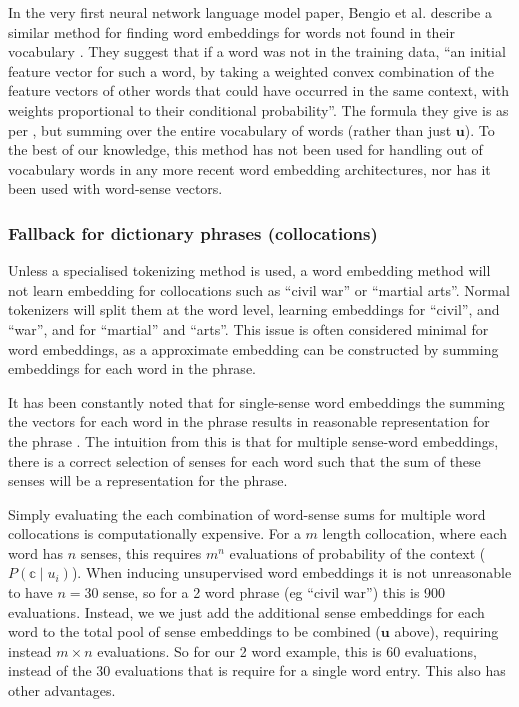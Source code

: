 \documentclass{sig-alternate}
\renewcommand{\u}{\mathbf{u}}
\begin{document}
In the very first neural network language model paper, Bengio et al. describe a similar method for finding word embeddings for words not found in their vocabulary \parencite{NPLM}. They suggest that if a word was not in the training data, \enquote{an initial feature vector for such a word, by taking a weighted convex combination of the feature vectors of other words that could have occurred in the same context, with weights proportional to their conditional probability}. The formula they give is as per , but summing over the entire vocabulary of words (rather than just $\u$). To the best of our knowledge, this method has not been used for handling out of vocabulary words in any more recent word embedding architectures, nor has it been used with word-sense vectors.


\subsubsection {Fallback for dictionary phrases (collocations)}
Unless a specialised tokenizing method is used, a word embedding method will not learn embedding for collocations such as ``civil war'' or ``martial arts''. Normal tokenizers will split them at the word level, learning embeddings for ``civil'', and ``war'', and for ``martial'' and ``arts''. This issue is often considered minimal for word embeddings, as a approximate embedding can be constructed by summing embeddings for each word  in the phrase.

It has been constantly noted that for single-sense word embeddings the summing the vectors for each word in the phrase results in reasonable representation for the phrase  \parencite{mikolovSkip} . The intuition from this is that for multiple sense-word embeddings, there is a correct selection of senses for each word such that the sum of these senses will be a representation for the phrase.

Simply evaluating the each combination of word-sense sums for multiple word collocations is computationally expensive. For a $m$ length collocation, where each word has $n$ senses, this requires $m^n$ evaluations of probability of the context ($P(\mathbb{c}\mid u_i)$). When inducing unsupervised word embeddings it is not unreasonable to have $n=30$ sense, so for a 2 word phrase (eg ``civil war'') this is 900 evaluations.
Instead, we we just add the additional sense embeddings for each word to the total pool of sense embeddings to be combined ($\u$ above), requiring instead $m \times n$ evaluations. So for our 2 word example, this is 60 evaluations, instead of the 30 evaluations that is require for a single word entry. This also has other advantages.
\end{document}
